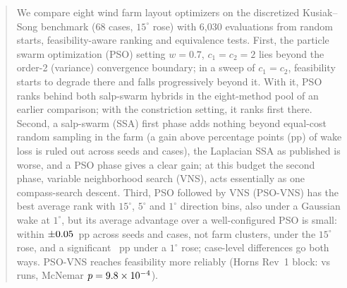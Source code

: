 \begin{abstract}
We compare eight wind farm layout optimizers on the discretized Kusiak--Song benchmark (68 cases, $15^\circ$ rose) with 6,030 evaluations from random starts, feasibility-aware ranking and equivalence tests. First, the particle swarm optimization (PSO) setting $w=0.7$, $c_1=c_2=2$ lies beyond the order-2 (variance) convergence boundary; in a sweep of $c_1=c_2$, feasibility starts to degrade there and falls progressively beyond it. With it, PSO ranks behind both salp-swarm hybrids in the eight-method pool of an earlier comparison; with the constriction setting, it ranks first there. Second, a salp-swarm (SSA) first phase adds nothing beyond equal-cost random sampling in the farm (a gain above \NEqMargin{} percentage points (pp) of wake loss is ruled out across seeds and cases), the Laplacian SSA as published is worse, and a PSO phase gives a clear gain; at this budget the second phase, variable neighborhood search (VNS), acts essentially as one compass-search descent. Third, PSO followed by VNS (PSO-VNS) has the best average rank with $15^\circ$, $5^\circ$ and $1^\circ$ direction bins, also under a Gaussian wake at $1^\circ$, but its average advantage over a well-configured PSO is small: within $\pm\NEqMargin$~pp across seeds and cases, not farm clusters, under the $15^\circ$ rose, and a significant \NFPairMeanOne~pp under a $1^\circ$ rose; case-level differences go both ways. PSO-VNS reaches feasibility more reliably (Horns Rev~1 block: \NHRFeasPSOVNS{} vs \NHRFeasPSO{} runs, McNemar $p=\NXHRMcNemarP$).

\end{abstract}
